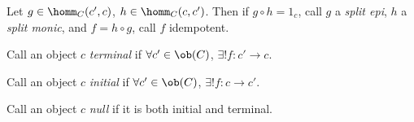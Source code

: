 Let $g \in \homm_C(c',c)$, $h \in \homm_C(c,c')$. Then if $g\circ h =
1_c$, call $g$ a \emph{split epi}, $h$ a \emph{split monic}, and $f =
h\circ g$, call $f$ idempotent.

\begin{definition}[Terminal]
  Call an object $c$ \emph{terminal} if $\forall c' \in \ob(C)$,
  $\exists ! f : c' \to c$. \\
\end{definition}

\begin{definition}[Initial]
  Call an object $c$ \emph{initial} if $\forall c' \in \ob(C)$,
  $\exists ! f : c \to c'$. \\
\end{definition}

\begin{definition}[Null]
  Call an object $c$ \emph{null} if it is both initial and terminal.
\end{definition}
